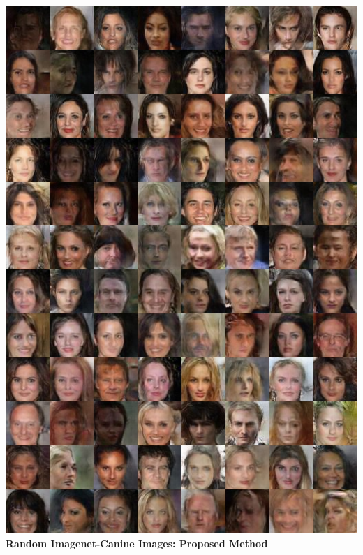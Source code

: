 \documentclass{article}
\begin{document}
\includegraphics[width=1.0\textwidth]{Figs/sup/dcg100k.jpg}\\
\clearpage
\textbf{Random Imagenet-Canine Images: Proposed Method}\\
\end{document}
